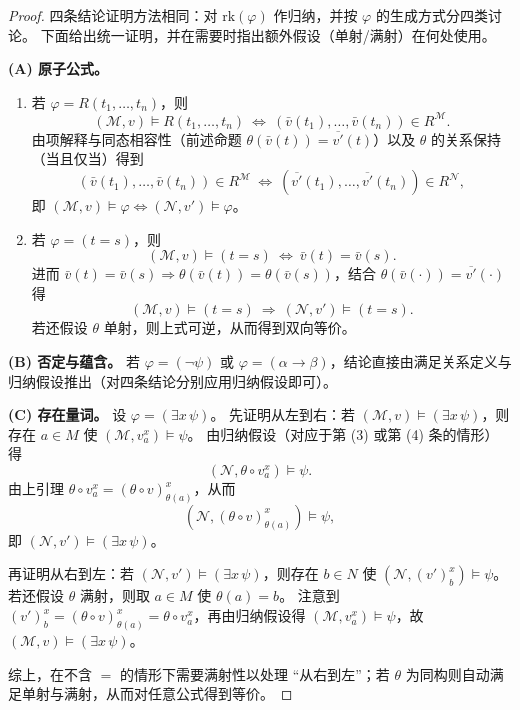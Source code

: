 \documentclass[lang=cn,a4paper,newtx,section]{elegantbook}
\begin{document}
 \begin{proof}
 四条结论证明方法相同：对 $\mathrm{rk}(\varphi)$ 作归纳，并按 $\varphi$ 的生成方式分四类讨论。
 下面给出统一证明，并在需要时指出额外假设（单射/满射）在何处使用。

 \textbf{(A) 原子公式。}
 \begin{enumerate}
   \item 若 $\varphi=R(t_1,\dots,t_n)$，则
   \[
     (\mathcal M,v)\models R(t_1,\dots,t_n)\ \Longleftrightarrow\ (\bar v(t_1),\dots,\bar v(t_n))\in R^{\mathcal M}.
   \]
   由项解释与同态相容性（前述命题 $\theta(\bar v(t))=\overline{v'}(t)$）以及 $\theta$ 的关系保持（当且仅当）得到
   \[
     (\bar v(t_1),\dots,\bar v(t_n))\in R^{\mathcal M}\ \Longleftrightarrow\ (\overline{v'}(t_1),\dots,\overline{v'}(t_n))\in R^{\mathcal N},
   \]
   即 $(\mathcal M,v)\models\varphi\Longleftrightarrow(\mathcal N,v')\models\varphi$。

   \item 若 $\varphi=(t=s)$，则
   \[
     (\mathcal M,v)\models(t=s)\ \Longleftrightarrow\ \bar v(t)=\bar v(s).
   \]
   进而 $\bar v(t)=\bar v(s)\Rightarrow\theta(\bar v(t))=\theta(\bar v(s))$，结合 $\theta(\bar v(\cdot))=\overline{v'}(\cdot)$ 得
   \[
     (\mathcal M,v)\models(t=s)\ \Longrightarrow\ (\mathcal N,v')\models(t=s).
   \]
   若还假设 $\theta$ 单射，则上式可逆，从而得到双向等价。
 \end{enumerate}

 \textbf{(B) 否定与蕴含。}
 若 $\varphi=(\neg\psi)$ 或 $\varphi=(\alpha\to\beta)$，结论直接由满足关系定义与归纳假设推出（对四条结论分别应用归纳假设即可）。

 \textbf{(C) 存在量词。}
 设 $\varphi=(\exists x\,\psi)$。
 先证明从左到右：若 $(\mathcal M,v)\models(\exists x\,\psi)$，则存在 $a\in M$ 使 $(\mathcal M,v_a^{x})\models\psi$。
 由归纳假设（对应于第 (3) 或第 (4) 条的情形）得
 \[
   (\mathcal N,\theta\circ v_a^{x})\models\psi.
 \]
 由上引理 $\theta\circ v_a^{x}=(\theta\circ v)_{\theta(a)}^{x}$，从而
 \[
   (\mathcal N,(\theta\circ v)_{\theta(a)}^{x})\models\psi,
 \]
 即 $(\mathcal N,v')\models(\exists x\,\psi)$。

 再证明从右到左：若 $(\mathcal N,v')\models(\exists x\,\psi)$，则存在 $b\in N$ 使 $(\mathcal N,(v')_{b}^{x})\models\psi$。
 若还假设 $\theta$ 满射，则取 $a\in M$ 使 $\theta(a)=b$。
 注意到 $(v')_{b}^{x}=(\theta\circ v)_{\theta(a)}^{x}=\theta\circ v_a^{x}$，再由归纳假设得 $(\mathcal M,v_a^{x})\models\psi$，故 $(\mathcal M,v)\models(\exists x\,\psi)$。

 综上，在不含 $=$ 的情形下需要满射性以处理 ``从右到左''；若 $\theta$ 为同构则自动满足单射与满射，从而对任意公式得到等价。
 \end{proof}
\end{document}
